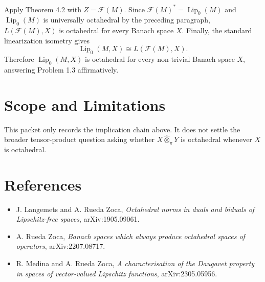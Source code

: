 \documentclass[11pt]{article}
\newcommand{\Lip}{\operatorname{Lip}_0}
\newcommand{\F}{\mathcal F}
\begin{document}
Apply Theorem 4.2 with \(Z=\F(M)\).  Since \(\F(M)^*=\Lip(M)\) and \(\Lip(M)\)
is universally octahedral by the preceding paragraph, \(L(\F(M),X)\) is
octahedral for every Banach space \(X\).  Finally, the standard linearization
isometry gives
\[
        \Lip(M,X) \cong L(\F(M),X).
\]
Therefore \(\Lip(M,X)\) is octahedral for every non-trivial Banach space
\(X\), answering Problem 1.3 affirmatively.

\section*{Scope and Limitations}

This packet only records the implication chain above.  It does not settle the
broader tensor-product question asking whether \(X\widehat{\otimes}_\pi Y\) is
octahedral whenever \(X\) is octahedral.

\section*{References}

\begin{itemize}
\item J. Langemets and A. Rueda Zoca, \emph{Octahedral norms in duals and
biduals of Lipschitz-free spaces}, arXiv:1905.09061.
\item A. Rueda Zoca, \emph{Banach spaces which always produce octahedral
spaces of operators}, arXiv:2207.08717.
\item R. Medina and A. Rueda Zoca, \emph{A characterisation of the Daugavet
property in spaces of vector-valued Lipschitz functions}, arXiv:2305.05956.
\end{itemize}
\end{document}
